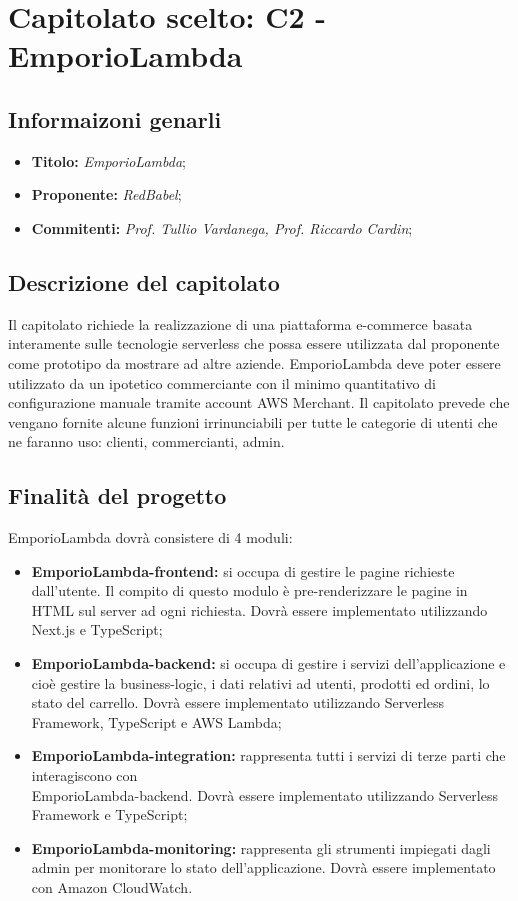\section{Capitolato scelto: C2 -  	EmporioLambda}
\subsection{Informaizoni genarli}
\begin{itemize}
    \item \textbf{Titolo:} \textit{EmporioLambda};
    \item \textbf{Proponente:} \textit{RedBabel};
    \item \textbf{Commitenti:} \textit{Prof. Tullio Vardanega, Prof. Riccardo Cardin};
\end{itemize}
\subsection{Descrizione del capitolato}
Il capitolato richiede la realizzazione di una piattaforma e-commerce 
basata interamente sulle tecnologie serverless che possa essere utilizzata 
dal proponente come prototipo da mostrare ad altre aziende. EmporioLambda 
deve poter essere utilizzato da un ipotetico commerciante con il minimo 
quantitativo di configurazione manuale tramite account AWS Merchant. 
Il capitolato prevede che vengano fornite alcune funzioni irrinunciabili 
per tutte le categorie di utenti che ne faranno uso: clienti, commercianti,
 admin.
\subsection{Finalità del progetto}
EmporioLambda dovrà consistere di 4 moduli: 
\begin{itemize}
    \item \textbf{EmporioLambda-frontend:} si occupa di gestire le pagine richieste dall’utente. Il compito di questo modulo è pre-renderizzare le pagine in HTML sul server ad ogni richiesta. Dovrà essere implementato utilizzando Next.js e TypeScript;
    \item \textbf{EmporioLambda-backend:} si occupa di gestire i servizi dell’applicazione e cioè gestire la business-logic, i dati relativi ad utenti, prodotti ed ordini, lo stato del carrello. Dovrà essere implementato utilizzando Serverless Framework, TypeScript e AWS Lambda;
    \item \textbf{EmporioLambda-integration:} rappresenta tutti i servizi di terze parti che interagiscono con \\EmporioLambda-backend. Dovrà essere implementato utilizzando Serverless Framework e TypeScript;
    \item \textbf{EmporioLambda-monitoring:} rappresenta gli strumenti impiegati dagli admin per monitorare lo stato dell’applicazione. Dovrà essere implementato con Amazon CloudWatch.
\end{itemize}
